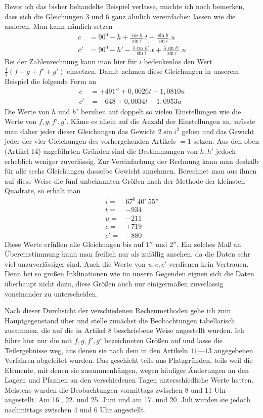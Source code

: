 Bevor ich das bisher behandelte Beispiel verlasse, möchte ich noch bemerken, dass sich die Gleichungen $3$ und $6$ ganz ähnlich vereinfachen lassen wie die anderen. Man kann nämlich setzen
\[
\begin{aligned}
c&=90^0-h+\frac{\cos h}{\sin i}.t-\frac{\sin h}{\sin i}.u\\
c'&=90^0-h'-\frac{\lambda\cos h'}{\sin i}.t+\frac{\lambda\sin h'}{\sin i}.u
\end{aligned}
\]
Bei der Zahlenrechnung kann man hier für $i$ bedenkenlos den Wert
$\frac14(f+g+f'+g')$ einsetzen. Damit nehmen diese Gleichungen in unserem Beispiel die folgende Form an
\[
\begin{aligned}
c&=+491''+0{,}0026t-1{,}0810u\\
c'&=-648+0{,}0034t+1{,}0953u
\end{aligned}
\]
Die Werte von $h$ und $h'$ beruhen auf doppelt so vielen Einstellungen wie die Werte von $f,g,f',g'$. Käme es allein auf die Anzahl der Einstellungen an, müsste man daher jeder dieser Gleichungen das Gewicht $2\sin i^2$ geben und das Gewicht jeder der vier Gleichungen des vorhergehenden Artikels $=1$ setzen. Aus den oben (Artikel 14) angeführten Gründen sind die Bestimmungen von $h,h'$ jedoch erheblich weniger zuverlässig. Zur Vereinfachung der Rechnung kann man deshalb für alle sechs Gleichungen dasselbe Gewicht annehmen. Berechnet man aus ihnen auf diese Weise die fünf unbekannten Größen nach der Methode der kleinsten Quadrate, so erhält man
\[
\begin{array}{rl}
i=&67^0\ 40'\ 55''\\
t=&-934\\
u=&-211\\
c=&+719\\
c'=&-880
\end{array}
\]
Diese Werte erfüllen alle Gleichungen bis auf $1''$ und $2''$. Ein solches Maß an Übereinstimmung kann man freilich nur als zufällig ansehen, da die Daten sehr viel unzuverlässiger sind. Auch die Werte von $u,c,c'$ verdienen kein Vertrauen. Denn bei so großen Inklinationen wie im unsern Gegenden eignen sich die Daten überhaupt nicht dazu, diese Größen auch nur einigermaßen zuverlässig voneinander zu unterscheiden.

Nach dieser Durchsicht der verschiedenen Rechenmethoden gehe ich zum Hauptgegenstand über und stelle zunächst die Beobachtungen tabellarisch zusammen, die auf die in Artikel 8 beschriebene Weise angestellt wurden. Ich führe hier nur die mit $f,g,f',g'$ bezeichneten Größen auf und lasse die Teilergebnisse weg, aus denen sie nach dem in den Artikeln $11$---$13$ angegebenen Verfahren abgeleitet wurden. Das geschieht teils aus Platzgründen, teils weil die Elemente, mit denen sie zusammenhängen,
wegen häufiger Änderungen an den Lagern und Pfannen an den verschiedenen Tagen unterschiedliche Werte hatten. Meistens wurden die Beobachtungen vormittags zwischen 8 und 11 Uhr angestellt. Am 16., 22. und 25. Juni und am 17. und 20. Juli wurden sie jedoch nachmittags zwischen 4 und 6 Uhr angestellt.

